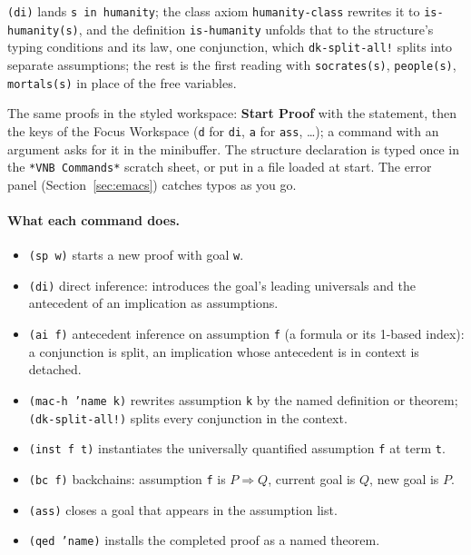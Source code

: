\texttt{(di)} lands \texttt{s in humanity}; the class axiom
\texttt{humanity-class} rewrites it to \texttt{is-humanity(s)}, and the
definition \texttt{is-humanity} unfolds that to the structure's typing
conditions and its law, one conjunction, which \texttt{dk-split-all!}
splits into separate assumptions; the rest is the first reading with
\texttt{socrates(s)}, \texttt{people(s)}, \texttt{mortals(s)} in place of
the free variables.

\begin{remark}
The same proofs in the styled workspace: \textbf{Start Proof} with the
statement, then the keys of the Focus Workspace (\texttt{d} for
\texttt{di}, \texttt{a} for \texttt{ass}, \ldots); a command with an
argument asks for it in the minibuffer.  The structure declaration is typed once in the
\texttt{*VNB Commands*} scratch sheet, or put in a file loaded at start.
The error panel (Section~\ref{sec:emacs}) catches typos as you go.
\end{remark}

\paragraph{What each command does.}
\begin{sloppypar}
\begin{itemize}
\item \texttt{(sp w)} starts a new proof with goal \texttt{w}.
\item \texttt{(di)} direct inference: introduces the goal's leading
  universals and the antecedent of an implication as assumptions.
\item \texttt{(ai f)} antecedent inference on assumption \texttt{f}
  (a formula or its 1-based index): a conjunction is split, an
  implication whose antecedent is in context is detached.
\item \texttt{(mac-h 'name k)} rewrites assumption \texttt{k} by the
  named definition or theorem; \texttt{(dk-split-all!)} splits every
  conjunction in the context.
\item \texttt{(inst f t)} instantiates the universally quantified
  assumption \texttt{f} at term \texttt{t}.
\item \texttt{(bc f)} backchains: assumption \texttt{f} is $P
  \Rightarrow Q$, current goal is $Q$, new goal is $P$.
\item \texttt{(ass)} closes a goal that appears in the assumption
  list.
\item \texttt{(qed 'name)} installs the completed proof as a named
  theorem.
\end{itemize}
\end{sloppypar}

